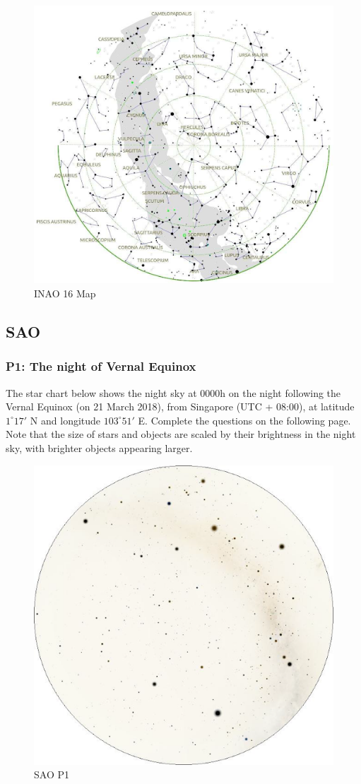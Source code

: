\documentclass[a4paper,12pt]{extarticle}
\begin{document}
\begin{figure}[H]
    \centering
    \includegraphics[width=0.9\linewidth]{INAI_16.png}
    \caption{INAO 16 Map}
    \label{INAO16}
\end{figure}
\subsection{SAO}
\subsubsection{P1: The night of Vernal Equinox}
The star chart below shows the night sky at 0000h on the night following the Vernal Equinox (on 21 March 2018), from Singapore (UTC + 08:00), at latitude $1^\circ17'$ N and longitude $103^\circ51'$ E. Complete the questions on the following page. Note that the size of stars and objects are scaled by their brightness in the night sky, with brighter objects appearing larger.

\begin{figure}[H]
    \centering
    \includegraphics[width=0.9\linewidth]{SAO_1.png}
    \caption{SAO P1}
\end{figure}
\end{document}
